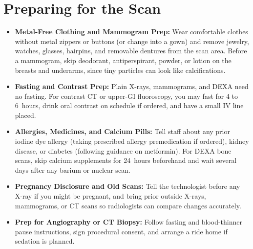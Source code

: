 \section{Preparing for the Scan}
\begin{itemize}
  \item \textbf{Metal-Free Clothing and Mammogram Prep:} Wear comfortable clothes without metal zippers or buttons (or change into a gown) and remove jewelry, watches, glasses, hairpins, and removable dentures from the scan area. Before a mammogram, skip deodorant, antiperspirant, powder, or lotion on the breasts and underarms, since tiny particles can look like calcifications.
  \item \textbf{Fasting and Contrast Prep:} Plain X-rays, mammograms, and DEXA need no fasting. For contrast CT or upper-GI fluoroscopy, you may fast for 4 to 6~hours, drink oral contrast on schedule if ordered, and have a small IV line placed.
  \item \textbf{Allergies, Medicines, and Calcium Pills:} Tell staff about any prior iodine dye allergy (taking prescribed allergy premedication if ordered), kidney disease, or diabetes (following guidance on metformin). For DEXA bone scans, skip calcium supplements for 24~hours beforehand and wait several days after any barium or nuclear scan.
  \item \textbf{Pregnancy Disclosure and Old Scans:} Tell the technologist before any X-ray if you might be pregnant, and bring prior outside X-rays, mammograms, or CT scans so radiologists can compare changes accurately.
  \item \textbf{Prep for Angiography or CT Biopsy:} Follow fasting and blood-thinner pause instructions, sign procedural consent, and arrange a ride home if sedation is planned.
\end{itemize}

